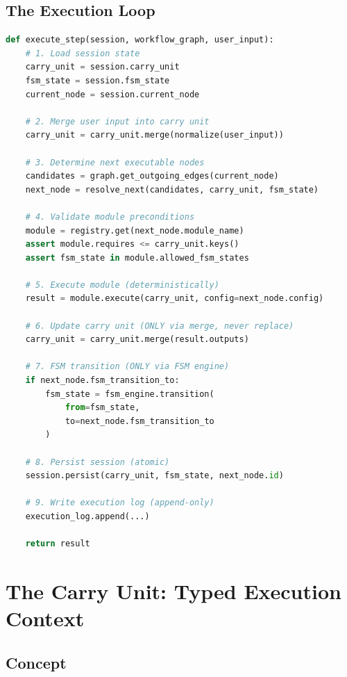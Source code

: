 \documentclass[12pt, a4paper]{report}
\begin{document}
\section{The Execution Loop}

\begin{lstlisting}[language=Python, caption={Pseudocode: Core Execution Loop}]
def execute_step(session, workflow_graph, user_input):
    # 1. Load session state
    carry_unit = session.carry_unit
    fsm_state = session.fsm_state
    current_node = session.current_node

    # 2. Merge user input into carry unit
    carry_unit = carry_unit.merge(normalize(user_input))

    # 3. Determine next executable nodes
    candidates = graph.get_outgoing_edges(current_node)
    next_node = resolve_next(candidates, carry_unit, fsm_state)

    # 4. Validate module preconditions
    module = registry.get(next_node.module_name)
    assert module.requires <= carry_unit.keys()
    assert fsm_state in module.allowed_fsm_states

    # 5. Execute module (deterministically)
    result = module.execute(carry_unit, config=next_node.config)

    # 6. Update carry unit (ONLY via merge, never replace)
    carry_unit = carry_unit.merge(result.outputs)

    # 7. FSM transition (ONLY via FSM engine)
    if next_node.fsm_transition_to:
        fsm_state = fsm_engine.transition(
            from=fsm_state,
            to=next_node.fsm_transition_to
        )

    # 8. Persist session (atomic)
    session.persist(carry_unit, fsm_state, next_node.id)

    # 9. Write execution log (append-only)
    execution_log.append(...)

    return result
\end{lstlisting}

\chapter{The Carry Unit: Typed Execution Context}

\section{Concept}
\end{document}
